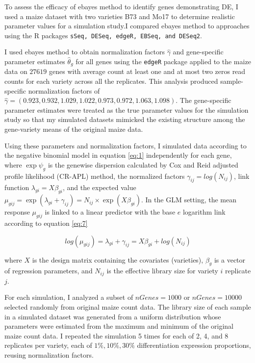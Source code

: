 \documentclass[11pt]{isuthesis}
\begin{document}
To assess the efficacy of ebayes method to identify genes demonstrating DE, I used a maize dataset with two varieties B73 and Mo17\citep{paschold2012complementation} to determine realistic parameter values for a simulation study.I compared ebayes method to approaches using the R packages {\tt sSeq, DESeq, edgeR, EBSeq, and DESeq2}.

I used ebayes method to obtain normalization factors $\hat{\gamma}$ and gene-specific parameter estimates $\hat{\theta}_g$ for all genes using the {\tt edgeR} package\citep{robinson2010edger} applied to the maize data\citep{paschold2012complementation} on $27619$ genes with average count at least one and at most two zeros read counts for each variety across all the replicates. This analysis produced sample-specific normalization factors of $\hat{\gamma} = (0.923, 0.932, 1.029, 1.022, 0.973, 0.972, 1.063, 1.098)$. The gene-specific parameter estimates were treated as the true parameter values for the simulation study so that my simulated datasets mimicked the existing structure among the gene-variety means of the original maize data.

Using these parameters and normalization factors, I simulated data according to the negative binomial model in equation \ref{eq:1} independently for each gene, where $\exp{\psi_g}$ is the genewise dispersion calculated by Cox and Reid adjusted profile likelihood (CR-APL) method, the normalized factors $\gamma_{ij} = log(N_{ij})$, link function $\lambda_{gi} = X\beta_{gi}$, and the expected value $\mu_{gij} = \exp{(\lambda_{gi}+\gamma_{ij})} = N_{ij} \times \exp{(X\beta_{gi})}$. In the GLM setting, the mean response $\mu_{gij}$ is linked to a linear predictor with the base $e$ logarithm link according to equation \ref{eq:7}

\begin{equation}
\label{eq:7}
log(\mu_{gij}) = \lambda_{gi}+\gamma_{ij} = X\beta_{gi} + log(N_{ij})
\end{equation}

where $X$ is the design matrix containing the covariates (varieties), $\beta_g$ is a vector of regression parameters, and $N_{ij}$ is the effective library size for variety $i$ replicate $j$.

For each simulation, I analyzed a subset of $nGenes=1000$ or $nGenes=10000$ selected randomly from original maize count data. The library size of each sample in a simulated dataset was generated from a uniform distribution whose parameters were estimated from the maximum and minimum of the original maize count data. I repeated the simulation 5 times for each of 2, 4, and 8 replicates per variety, each of $1\%, 10\%, 30\%$ differentiation expression proportions, reusing normalization factors. 
\end{document}
